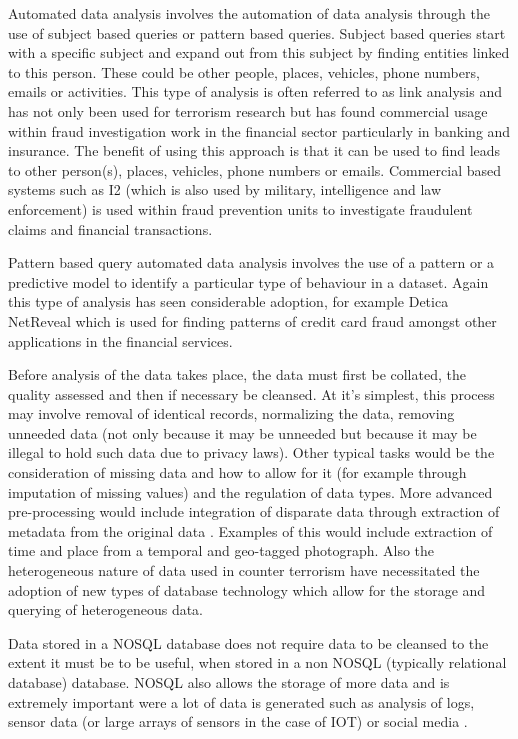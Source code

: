 Automated data analysis involves the automation of data analysis through the use of subject based queries or pattern based queries. Subject based queries start with a specific subject and expand out from this subject by finding entities linked to this person. These could be other people, places, vehicles, phone numbers, emails or activities. This type of analysis is often referred to as link analysis \citep{berry1997data} and has not only been used for terrorism research but has found commercial usage within fraud investigation work in the financial sector particularly in banking and insurance. The benefit of using this approach is that it can be used to find leads to other person(s), places, vehicles, phone numbers or emails. Commercial based systems such as I2 \citep{i2Analyze2016} (which is also used by military, intelligence and law enforcement) is used within fraud prevention units to investigate fraudulent claims and financial transactions.

Pattern based query automated data analysis involves the use of a pattern or a predictive model to identify a particular type of behaviour in a dataset. Again this type of analysis has seen considerable adoption, for example Detica NetReveal \citep{oatley2011data} which is used for finding patterns of credit card fraud amongst other applications in the financial services.  

Before analysis of the data takes place, the data must first be collated, the quality assessed and then if necessary be cleansed. At it's simplest, this process may involve removal of identical records, normalizing the data, removing unneeded data (not only because it may be unneeded but because it may be illegal to hold such data due to privacy laws). Other typical tasks would be the consideration of missing data and how to allow for it (for example through imputation of missing values) and the regulation of data types. More advanced pre-processing would include integration of disparate data through extraction of metadata from the original data \citep{derosa2004data}. Examples of this would include extraction of  time and place from a temporal and geo-tagged photograph. Also the heterogeneous nature of data used in counter terrorism have necessitated the adoption of new types of database technology which allow for the storage and querying of heterogeneous data.  

Data stored in a NOSQL database does not require data to be cleansed to the extent it must be to be useful, when stored in a non NOSQL (typically relational database) database. NOSQL also allows the storage of more data and is extremely important were a lot of data is generated such as analysis of logs, sensor data (or large arrays of sensors in the case of IOT) or social media \citep{jeberson2015survey}.

